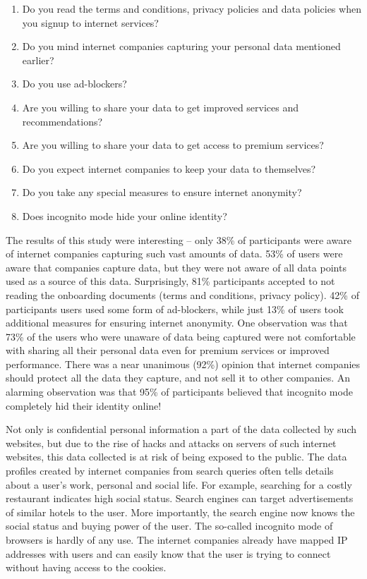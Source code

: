 \documentclass[10pt, a4paper, twocolumn]{article} %
\begin{document}
\begin{enumerate}
\item Do you read the terms and conditions, privacy policies and data policies when you signup to internet services?
\item Do you mind internet companies capturing your personal data mentioned earlier?
\item Do you use ad-blockers?
\item 	Are you willing to share your data to get improved services and recommendations?
\item 	Are you willing to share your data to get access to premium services?
\item 	Do you expect internet companies to keep your data to themselves?
\item 	Do you take any special measures to ensure internet anonymity?
\item 	Does incognito mode hide your online identity?
\end{enumerate}

The results of this study were interesting – only 38\% of participants were aware of internet companies capturing such vast amounts of data. 53\% of users were aware that companies capture data, but they were not aware of all data points used as a source of this data. Surprisingly, 81\% participants accepted to not reading the onboarding documents (terms and conditions, privacy policy). 42\% of participants users used some form of ad-blockers, while just 13\% of users took additional measures for ensuring internet anonymity. One observation was that 73\% of the users who were unaware of data being captured were not comfortable with sharing all their personal data even for premium services or improved performance. There was a near unanimous (92\%) opinion that internet companies should protect all the data they capture, and not sell it to other companies. An alarming observation was that 95\% of participants believed that incognito mode completely hid their identity online!\newline

Not only is confidential personal information a part of the data collected by such websites, but due to the rise of hacks and attacks on servers of such internet websites, this data collected is at risk of being exposed to the public. The data profiles created by internet companies from search queries often tells details about a user’s work, personal and social life. For example, searching for a costly restaurant indicates high social status. Search engines can target advertisements of similar hotels to the user. More importantly, the search engine now knows the social status and buying power of the user. The so-called incognito mode of browsers is hardly of any use. The internet companies already have mapped IP addresses with users and can easily know that the user is trying to connect without having access to the cookies.
\end{document}

